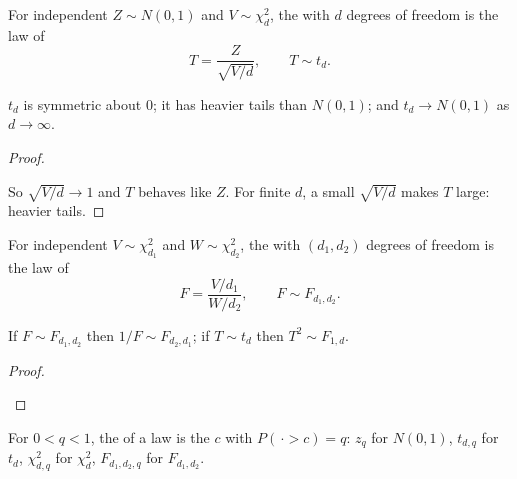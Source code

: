 \begin{definition}[$t$ distribution]
For independent $Z\sim N(0,1)$ and $V\sim\chi^2_d$, the  with $d$ degrees of freedom is the law of
\[
  \boxed{\;T=\frac{Z}{\sqrt{V/d}},\qquad T\sim t_d.\;}
\]
\end{definition}

\begin{result}
$t_d$ is symmetric about $0$; it has heavier tails than $N(0,1)$; and $t_d\to N(0,1)$ as $d\to\infty$.
\end{result}
\begin{proof}
\begin{deriv}
\end{deriv}
So $\sqrt{V/d}\to1$ and $T$ behaves like $Z$. For finite $d$, a small $\sqrt{V/d}$ makes $T$ large: heavier tails.
\end{proof}

\begin{definition}[$F$ distribution]
For independent $V\sim\chi^2_{d_1}$ and $W\sim\chi^2_{d_2}$, the  with $(d_1,d_2)$ degrees of freedom is the law of
\[
  \boxed{\;F=\frac{V/d_1}{W/d_2},\qquad F\sim F_{d_1,d_2}.\;}
\]
\end{definition}

\begin{result}
If $F\sim F_{d_1,d_2}$ then $\boxed{1/F\sim F_{d_2,d_1}}$; if $T\sim t_d$ then $\boxed{T^2\sim F_{1,d}}$.
\end{result}
\begin{proof}
\begin{deriv}
\end{deriv}
\end{proof}

\begin{definition}
For $0<q<1$, the  of a law is the $c$ with $P(\,\cdot>c)=q$: $z_q$ for $N(0,1)$, $t_{d,q}$ for $t_d$, $\chi^2_{d,q}$ for $\chi^2_d$, $F_{d_1,d_2,q}$ for $F_{d_1,d_2}$.
\end{definition}

